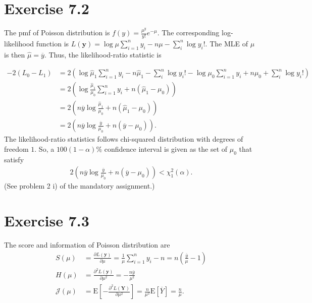 \documentclass[a4paper]{article}
\newcommand{\E}{\mathrm{E}}
\begin{document}
\vspace{\baselineskip}
\section{Exercise 7.2}
The pmf of Poisson distribution is $f(y) = \frac{\mu^{y}}{y!}e^{-\mu}$. The corresponding log-likelihood function is $L(\bm{y}) = \log\mu\sum_{i=1}^{n}y_{i} - n\mu -\sum_{i}^{n}\log y_{i}!$. The MLE of $\mu$ is then $\widehat{\mu} = \overline{y}$. Thus, the likelihood-ratio statistic is

\begin{align*}
-2\left(L_{0} - L_{1}\right) &= 2\left(
\log\widehat{\mu}_{1}\sum_{i=1}^{n}y_{i} - n\widehat{\mu}_{1} -\sum_{i}^{n}\log y_{i}!
-\log\mu_{0}\sum_{i=1}^{n}y_{i} +n\mu_{0} +\sum_{i}^{n}\log y_{i}!
\right)\\
&= 2\left(\log\frac{\widehat{\mu}_{1}}{\mu_{0}}\sum_{i=1}^{n}y_{i} +n\left(\widehat{\mu}_{1} -\mu_{0}\right)\right)\\
&= 2\left(n\overline{y}\log\frac{\widehat{\mu}_{1}}{\mu_{0}} +n\left(\widehat{\mu}_{1} -\mu_{0}\right)\right)\\
&= 2\left(n\overline{y}\log\frac{\overline{y}}{\mu_{0}} +n\left(\overline{y} -\mu_{0}\right)\right).
\end{align*}
The likelihood-ratio statistics follows chi-squared distribution with degrees of freedom $1$. So, a $100(1-\alpha)\%$ confidence interval is given as the set of $\mu_{0}$ that satisfy
\begin{align*}
2\left(n\overline{y}\log\frac{\overline{y}}{\mu_{0}} +n\left(\overline{y} -\mu_{0}\right)\right) < \chi_{1}^{2}(\alpha).
\end{align*}
(See problem 2 i) of the mandatory assignment.)



\vspace{\baselineskip}
\section{Exercise 7.3}
The score and information of Poisson distribution are
\begin{align*}
S(\mu) &= \frac{\partial L(\bm{y})}{\partial \mu} = \frac{1}{\mu}\sum_{i=1}^{n}y_{i} -n = n\left(\frac{\overline{y}}{\mu}-1\right)\\
H(\mu) &= \frac{\partial^{2} L(\bm{y})}{\partial \mu^{2}} = -\frac{n\overline{y}}{\mu^{2}}\\
\mathcal{J}(\mu) &= \E\left[-\frac{\partial^{2} L(\bm{Y})}{\partial \mu^{2}}\right] = \frac{n}{\mu^{2}}\E\left[\overline{Y}\right] = \frac{n}{\mu}.
\end{align*}
\end{document}

